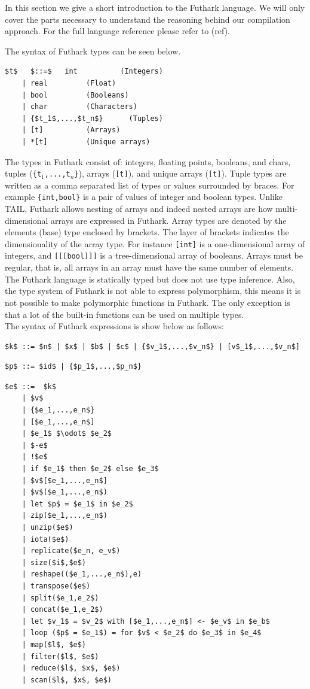 \documentclass[11pt]{article}
\begin{document}
In this section we give a short introduction to the Futhark language. We will only cover the parts necessary to understand
the reasoning behind our compilation approach. For the full language reference please refer to (ref).

The syntax of Futhark types can be seen below.
\begin{lstlisting}[numbers=none,frame=none]
$t$   $::=$   int          (Integers)
    | real         (Float)
    | bool         (Booleans)
    | char         (Characters)
    | {$t_1$,...,$t_n$}      (Tuples)
    | [t]          (Arrays)
    | *[t]         (Unique arrays)
\end{lstlisting}
The types in Futhark consist of: integers, floating points, booleans, and chars, tuples ({\tt \{t$_1$,...,t$_n$\}}), arrays ({\tt [t]}), and unique arrays ({\tt *[t]}).
Tuple types are written as a comma separated list of types or values surrounded by braces. For example {\tt\{int,bool\}} is 
a pair of values of integer and boolean types.
Unlike TAIL, Futhark allows nesting of arrays and indeed nested arrays are how multi-dimensional arrays are expressed in Futhark.
Array types are denoted by the elements (base) type enclosed by brackets.
The layer of brackets indicates the dimensionality of the array type.
For instance {\tt [int]} is a one-dimensional array of integers, and {\tt [[[bool]]]} is a tree-dimensional array of booleans.
Arrays must be regular, that is, all arrays in an array must have the same number of elements. \\

The Futhark language is statically typed but does not use type inference. Also, the type system of Futhark is not 
able to express polymorphism, this means it is not possible to make polymorphic functions in Futhark.
The only exception is that a lot of the built-in functions can be used on multiple types.\\

The syntax of Futhark expressions is show below as follows:
\begin{lstlisting}[numbers=none,frame=none]
$k$ ::= $n$ | $x$ | $b$ | $c$ | {$v_1$,...,$v_n$} | [v$_1$,...,$v_n$] 
\end{lstlisting}
\begin{lstlisting}[numbers=none,frame=none]
$p$ ::= $id$ | {$p_1$,...,$p_n$}
\end{lstlisting}

\begin{lstlisting}[numbers=none,frame=none]
$e$ ::=  $k$
    | $v$ 
    | {$e_1,...,e_n$} 
    | [$e_1,...,e_n$] 
    | $e_1$ $\odot$ $e_2$ 
    | $-e$ 
    | !$e$ 
    | if $e_1$ then $e_2$ else $e_3$ 
    | $v$[$e_1,...,e_n$] 
    | $v$($e_1,...,e_n$) 
    | let $p$ = $e_1$ in $e_2$
    | zip($e_1,...,e_n$) 
    | unzip($e$)
    | iota($e$) 
    | replicate($e_n, e_v$) 
    | size($i$,$e$) 
    | reshape(($e_1,...,e_n$),e)
    | transpose($e$)
    | split($e_1,e_2$)
    | concat($e_1,e_2$)
    | let $v_1$ = $v_2$ with [$e_1,...,e_n$] <- $e_v$ in $e_b$
    | loop ($p$ = $e_1$) = for $v$ < $e_2$ do $e_3$ in $e_4$
    | map($l$, $e$)
    | filter($l$, $e$)
    | reduce($l$, $x$, $e$)
    | scan($l$, $x$, $e$)
\end{lstlisting}
\end{document}
